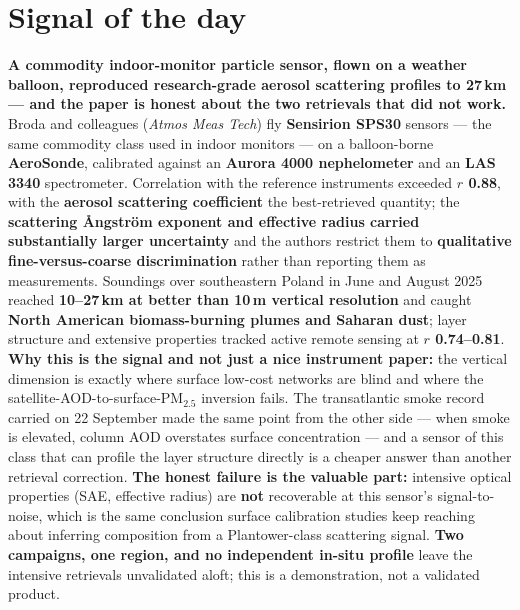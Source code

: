 \documentclass[10pt]{article}
\begin{document}
\vspace{6mm}

\section*{\sffamily\bfseries\color{Deep}Signal of the day}
\vspace{-1.5mm}{\color{Amber}\rule{\linewidth}{1.1pt}}\vspace{2.5mm}

\begin{keybox}
{\sffamily\bfseries\small\color{Deep}A commodity indoor-monitor particle sensor, flown on a
weather balloon, reproduced research-grade aerosol scattering profiles to 27\,km --- and the paper is honest
about the two retrievals that did not work.}\\[1.4mm]
\footnotesize
Broda and colleagues (\textit{Atmos Meas Tech}) fly \textbf{Sensirion SPS30} sensors ---
the same commodity class used in indoor monitors --- on a balloon-borne \textbf{AeroSonde},
calibrated against an \textbf{Aurora 4000 nephelometer} and an \textbf{LAS 3340}
spectrometer. Correlation with the reference instruments exceeded \textbf{$r$ 0.88}, with
the \textbf{aerosol scattering coefficient} the best-retrieved quantity; the
\textbf{scattering \r{A}ngstr\"om exponent and effective radius carried substantially
larger uncertainty} and the authors restrict them to \textbf{qualitative fine-versus-coarse
discrimination} rather than reporting them as measurements. Soundings over southeastern
Poland in June and August 2025 reached \textbf{10--27\,km at better than 10\,m vertical
resolution} and caught \textbf{North American biomass-burning plumes and Saharan dust};
layer structure and extensive properties tracked active remote sensing at \textbf{$r$
0.74--0.81}. \textbf{Why this is the signal and not just a nice instrument paper:} the
vertical dimension is exactly where surface low-cost networks are blind and where the
satellite-AOD-to-surface-PM$_{2.5}$ inversion fails. The transatlantic smoke record carried
on 22 September made the same point from the other side --- when smoke is elevated, column
AOD overstates surface concentration --- and a sensor of this class that can profile the
layer structure directly is a cheaper answer than another retrieval correction. \textbf{The
honest failure is the valuable part:} intensive optical properties (SAE, effective radius)
are \textbf{not} recoverable at this sensor's signal-to-noise, which is the same conclusion
surface calibration studies keep reaching about inferring composition from a
Plantower-class scattering signal. \textbf{Two campaigns, one region, and no independent
in-situ profile} leave the intensive retrievals unvalidated aloft; this is a demonstration,
not a validated product.\par
\end{keybox}
\end{document}
